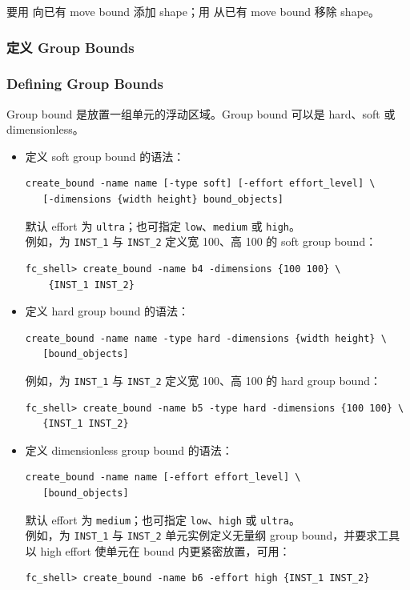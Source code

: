 要用  向已有 move bound 添加 shape；用  从已有 move bound 移除 shape。

\subsubsection{定义 Group Bounds}
\subsubsection*{Defining Group Bounds}

Group bound 是放置一组单元的浮动区域。Group bound 可以是 hard、soft 或 dimensionless。
\begin{itemize}
  \item 定义 soft group bound 的语法：
\begin{lstlisting}
create_bound -name name [-type soft] [-effort effort_level] \
   [-dimensions {width height} bound_objects]
\end{lstlisting}
    默认 effort 为 \texttt{ultra}；也可指定 \texttt{low}、\texttt{medium} 或 \texttt{high}。\\
    例如，为 \texttt{INST\_1} 与 \texttt{INST\_2} 定义宽 100、高 100 的 soft group bound：
\begin{lstlisting}
fc_shell> create_bound -name b4 -dimensions {100 100} \
    {INST_1 INST_2}
\end{lstlisting}

  \item 定义 hard group bound 的语法：
\begin{lstlisting}
create_bound -name name -type hard -dimensions {width height} \
   [bound_objects]
\end{lstlisting}
    例如，为 \texttt{INST\_1} 与 \texttt{INST\_2} 定义宽 100、高 100 的 hard group bound：
\begin{lstlisting}
fc_shell> create_bound -name b5 -type hard -dimensions {100 100} \
   {INST_1 INST_2}
\end{lstlisting}

  \item 定义 dimensionless group bound 的语法：
\begin{lstlisting}
create_bound -name name [-effort effort_level] \
   [bound_objects]
\end{lstlisting}
    默认 effort 为 \texttt{medium}；也可指定 \texttt{low}、\texttt{high} 或 \texttt{ultra}。\\
    例如，为 \texttt{INST\_1} 与 \texttt{INST\_2} 单元实例定义无量纲 group bound，并要求工具以 high effort 使单元在 bound 内更紧密放置，可用：
\begin{lstlisting}
fc_shell> create_bound -name b6 -effort high {INST_1 INST_2}
\end{lstlisting}
\end{itemize}

